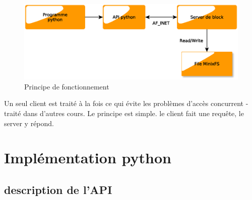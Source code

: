 \documentclass[a4paper,12pt]{article}
\begin{document}
\begin{figure}[H]
\begin{center}
\includegraphics[scale=.6]{imgs/schema_client_server}
\caption{Principe de fonctionnement}
\label{fig:Architecture client server}
\end{center}
\end{figure}


Un seul client est traité à la fois ce qui évite les problèmes d'accès concurrent - traité dans d'autres cours. Le principe est simple. le client fait une requête, le server y répond.\\



\section{Implémentation python}

\subsection{description de l'API}
\end{document}
